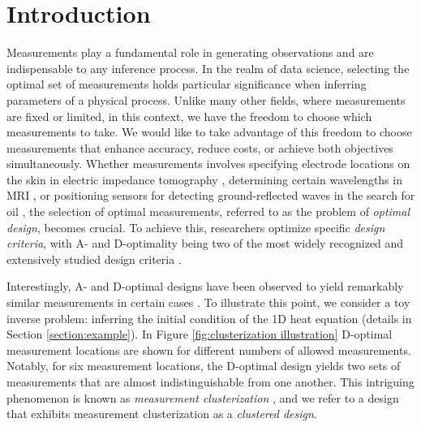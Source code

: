 \section{Introduction}\label{section:intro}
Measurements play a fundamental role in generating observations and
are indispensable to any inference process. In the realm of data
science, selecting the optimal set of measurements holds particular
significance when inferring parameters of a physical process. Unlike
many other fields, where measurements are fixed or limited, in this
context, we have the freedom to choose which measurements to take. We
would like to take advantage of this freedom to choose measurements
that enhance accuracy, reduce costs, or achieve both objectives
simultaneously. Whether measurements involves specifying electrode
locations on the skin in electric impedance tomography
\cite{horesh2010impedance}, determining certain wavelengths in MRI
\cite{horesh2008mri}, or positioning sensors for detecting
ground-reflected waves in the search for oil
\cite{horesh2008borehole}, the selection of optimal measurements,
referred to as the problem of \emph{optimal design}, becomes
crucial. To achieve this, researchers optimize specific \emph{design
criteria}, with A- and D-optimality being two of the most widely
recognized and extensively studied design criteria
\cite{Chaloner1995}.


Interestingly, A- and D-optimal designs have been observed to yield
remarkably similar measurements in certain cases \cite{fedorov1996,
  hooker2009, fedorov2012, Ucinski05, neitzel2019sparse}. To
illustrate this point, we consider a toy inverse problem: inferring
the initial condition of the 1D heat equation (details in Section
\ref{section:example}). In Figure \ref{fig:clusterization
  illustration} D-optimal measurement locations are shown for
different numbers of allowed measurements. Notably, for six
measurement locations, the D-optimal design yields two sets of
measurements that are almost indistinguishable from one another. This
intriguing phenomenon is known as \emph{measurement clusterization}
\cite{Ucinski05}, and we refer to a design that exhibits measurement
clusterization as a \emph{clustered design}.


